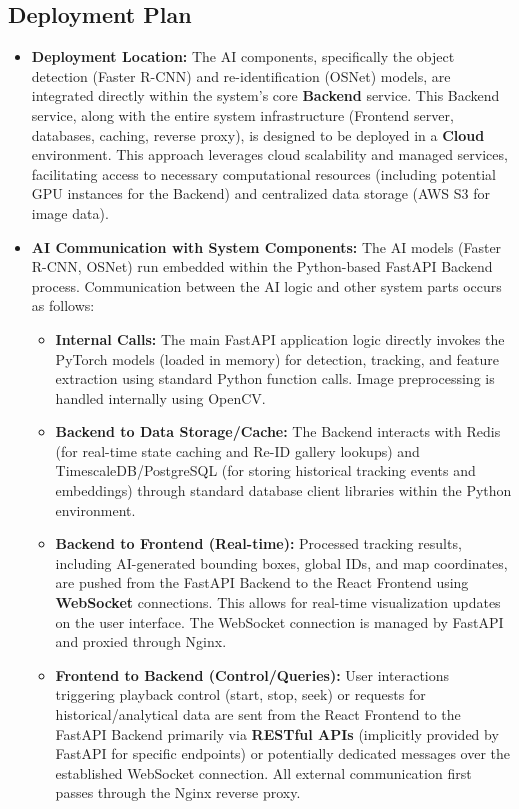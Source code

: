 \subsection{Deployment Plan}
\label{subsection:deployment_plan} %
\begin{itemize}
    \item \textbf{Deployment Location:}
        The AI components, specifically the object detection (Faster R-CNN) and re-identification (OSNet) models, are integrated directly within the system's core \textbf{Backend} service. This Backend service, along with the entire system infrastructure (Frontend server, databases, caching, reverse proxy), is designed to be deployed in a \textbf{Cloud} environment. This approach leverages cloud scalability and managed services, facilitating access to necessary computational resources (including potential GPU instances for the Backend) and centralized data storage (AWS S3 for image data).

    \item \textbf{AI Communication with System Components:}
        The AI models (Faster R-CNN, OSNet) run embedded within the Python-based FastAPI Backend process. Communication between the AI logic and other system parts occurs as follows:
        \begin{itemize}
            \item \textbf{Internal Calls:} The main FastAPI application logic directly invokes the PyTorch models (loaded in memory) for detection, tracking, and feature extraction using standard Python function calls. Image preprocessing is handled internally using OpenCV.
            \item \textbf{Backend to Data Storage/Cache:} The Backend interacts with Redis (for real-time state caching and Re-ID gallery lookups) and TimescaleDB/PostgreSQL (for storing historical tracking events and embeddings) through standard database client libraries within the Python environment.
            \item \textbf{Backend to Frontend (Real-time):} Processed tracking results, including AI-generated bounding boxes, global IDs, and map coordinates, are pushed from the FastAPI Backend to the React Frontend using \textbf{WebSocket} connections. This allows for real-time visualization updates on the user interface. The WebSocket connection is managed by FastAPI and proxied through Nginx.
            \item \textbf{Frontend to Backend (Control/Queries):} User interactions triggering playback control (start, stop, seek) or requests for historical/analytical data are sent from the React Frontend to the FastAPI Backend primarily via \textbf{RESTful APIs} (implicitly provided by FastAPI for specific endpoints) or potentially dedicated messages over the established WebSocket connection. All external communication first passes through the Nginx reverse proxy.
        \end{itemize}


\end{itemize}
